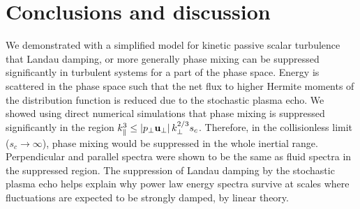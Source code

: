 %
    
\section{Conclusions and discussion}

    We demonstrated with a simplified model for kinetic passive scalar turbulence that
    Landau damping, or more generally phase mixing can be suppressed significantly in
    turbulent systems for a part of the phase space. Energy is scattered in the phase
    space such that the net flux to higher Hermite moments of the distribution
    function is reduced due to the stochastic plasma echo.
    We showed using direct numerical simulations that phase mixing is 
    suppressed significantly in the region $k_\parallel^3 \leq \left|p_\perp \mathbf{u_\perp}\right| k_\perp^{2/3} s_c$.
    Therefore, in the collisionless limit ($s_c \to \infty$), phase mixing would be suppressed
    in the whole inertial range.
    Perpendicular and parallel spectra were shown to be the same as fluid spectra in the
    suppressed region.
    The suppression of Landau damping by the stochastic plasma echo helps explain why
    power law energy spectra survive at scales where fluctuations are expected to be
    strongly damped, by linear theory.

